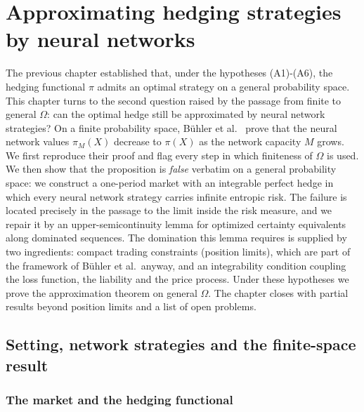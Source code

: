 \documentclass[11pt,a4paper]{report}
\numberwithin{equation}{chapter}
\theoremstyle{plain}
\theoremstyle{definition}
\begin{document}
\setcounter{chapter}{3}

\chapter{Approximating hedging strategies by neural networks}

The previous chapter established that, under the hypotheses (A1)-(A6), the hedging functional $\pi$ admits an optimal strategy on a general probability space. This chapter turns to the second question raised by the passage from finite to general $\Omega$: can the optimal hedge still be approximated by neural network strategies? On a finite probability space, B\"uhler et al.\ \cite[Proposition~4.3]{buehler} prove that the neural network values $\pi_M(X)$ decrease to $\pi(X)$ as the network capacity $M$ grows. We first reproduce their proof and flag every step in which finiteness of $\Omega$ is used. We then show that the proposition is \emph{false} verbatim on a general probability space: we construct a one-period market with an integrable perfect hedge in which every neural network strategy carries infinite entropic risk. The failure is located precisely in the passage to the limit inside the risk measure, and we repair it by an upper-semicontinuity lemma for optimized certainty equivalents along dominated sequences. The domination this lemma requires is supplied by two ingredients: compact trading constraints (position limits), which are part of the framework of B\"uhler et al.\ anyway, and an integrability condition coupling the loss function, the liability and the price process. Under these hypotheses we prove the approximation theorem on general $\Omega$. The chapter closes with partial results beyond position limits and a list of open problems.

\section{Setting, network strategies and the finite-space result}\label{sec:finite}

\subsection*{The market and the hedging functional}
\end{document}
